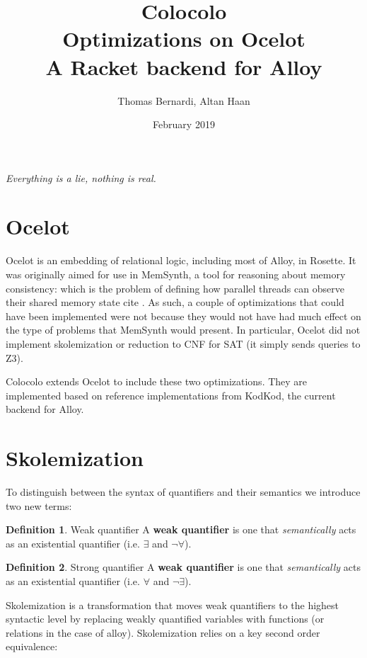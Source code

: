 \documentclass{article}
\title{Colocolo\\\large Optimizations on Ocelot \\ A Racket backend for Alloy}
\date{February 2019}
\author{Thomas Bernardi, Altan Haan}
\theoremstyle{definition}
\newtheorem{definition}{Definition}[section]
\begin{document}
	\maketitle
	\begin{center}	
		\textit{Everything is a lie, nothing is real.} \\
    \end{center}

    \section{Ocelot}

    Ocelot is an embedding of relational logic, including most of Alloy, in Rosette. It was originally aimed for use in MemSynth, a tool for reasoning about memory consistency: which is the problem of defining how parallel threads can observe their shared memory state cite \cite{bornholdt17}. As such, a couple of optimizations that could have been implemented were not because they would not have had much effect on the type of problems that MemSynth would present. In particular, Ocelot did not implement skolemization or reduction to CNF for SAT (it simply sends queries to Z3).

    Colocolo extends Ocelot to include these two optimizations. They are implemented based on reference implementations from KodKod, the current backend for Alloy.

    \section{Skolemization}

    To distinguish between the syntax of quantifiers and their semantics we introduce two new terms:\\
    \theoremstyle{definition}
    \begin{definition}{Weak quantifier}
        A \textbf{weak quantifier} is one that \emph{semantically} acts as an existential quantifier (i.e. $\exists$ and $\neg \forall$).
    \end{definition}

    \begin{definition}{Strong quantifier}
        A \textbf{weak quantifier} is one that \emph{semantically} acts as an existential quantifier (i.e. $\forall$ and $\neg \exists$).
    \end{definition}

    Skolemization is a transformation that moves weak quantifiers to the highest syntactic level by replacing weakly quantified variables with functions (or relations in the case of alloy). Skolemization relies on a key second order equivalence:
\end{document}
